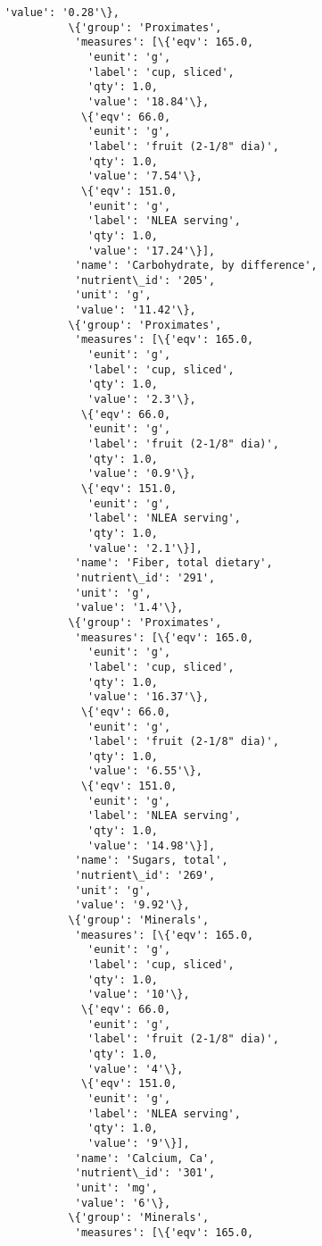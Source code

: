\documentclass[11pt]{article}
\begin{document}
\begin{Verbatim}[commandchars=\\\{\}]
           'value': '0.28'\},
          \{'group': 'Proximates',
           'measures': [\{'eqv': 165.0,
             'eunit': 'g',
             'label': 'cup, sliced',
             'qty': 1.0,
             'value': '18.84'\},
            \{'eqv': 66.0,
             'eunit': 'g',
             'label': 'fruit (2-1/8" dia)',
             'qty': 1.0,
             'value': '7.54'\},
            \{'eqv': 151.0,
             'eunit': 'g',
             'label': 'NLEA serving',
             'qty': 1.0,
             'value': '17.24'\}],
           'name': 'Carbohydrate, by difference',
           'nutrient\_id': '205',
           'unit': 'g',
           'value': '11.42'\},
          \{'group': 'Proximates',
           'measures': [\{'eqv': 165.0,
             'eunit': 'g',
             'label': 'cup, sliced',
             'qty': 1.0,
             'value': '2.3'\},
            \{'eqv': 66.0,
             'eunit': 'g',
             'label': 'fruit (2-1/8" dia)',
             'qty': 1.0,
             'value': '0.9'\},
            \{'eqv': 151.0,
             'eunit': 'g',
             'label': 'NLEA serving',
             'qty': 1.0,
             'value': '2.1'\}],
           'name': 'Fiber, total dietary',
           'nutrient\_id': '291',
           'unit': 'g',
           'value': '1.4'\},
          \{'group': 'Proximates',
           'measures': [\{'eqv': 165.0,
             'eunit': 'g',
             'label': 'cup, sliced',
             'qty': 1.0,
             'value': '16.37'\},
            \{'eqv': 66.0,
             'eunit': 'g',
             'label': 'fruit (2-1/8" dia)',
             'qty': 1.0,
             'value': '6.55'\},
            \{'eqv': 151.0,
             'eunit': 'g',
             'label': 'NLEA serving',
             'qty': 1.0,
             'value': '14.98'\}],
           'name': 'Sugars, total',
           'nutrient\_id': '269',
           'unit': 'g',
           'value': '9.92'\},
          \{'group': 'Minerals',
           'measures': [\{'eqv': 165.0,
             'eunit': 'g',
             'label': 'cup, sliced',
             'qty': 1.0,
             'value': '10'\},
            \{'eqv': 66.0,
             'eunit': 'g',
             'label': 'fruit (2-1/8" dia)',
             'qty': 1.0,
             'value': '4'\},
            \{'eqv': 151.0,
             'eunit': 'g',
             'label': 'NLEA serving',
             'qty': 1.0,
             'value': '9'\}],
           'name': 'Calcium, Ca',
           'nutrient\_id': '301',
           'unit': 'mg',
           'value': '6'\},
          \{'group': 'Minerals',
           'measures': [\{'eqv': 165.0,

\end{Verbatim}
\end{document}
